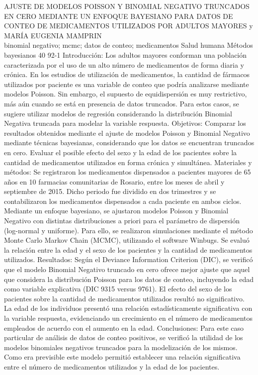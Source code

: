 \A
{AJUSTE DE MODELOS POISSON Y BINOMIAL NEGATIVO TRUNCADOS EN CERO MEDIANTE UN ENFOQUE BAYESIANO PARA DATOS DE CONTEO DE MEDICAMENTOS UTILIZADOS POR ADULTOS MAYORES}
{ y MARÍA EUGENIA MAMPRIN}
{
\\}
{binomial negativo; mcmc; datos de conteo; medicamentos} 
 {Salud humana} 
 {Métodos bayesianos} 
 {40} 
 {92-1}
{Introducción: Los adultos mayores conforman una población caracterizada por el uso de un alto número de medicamentos de forma diaria y crónica. En los estudios de utilización de medicamentos, la cantidad de fármacos utilizados por paciente es una variable de conteo que podría analizarse mediante modelos Poisson. Sin embargo, el supuesto de equidispersión es muy restrictivo, más aún cuando se está en presencia de datos truncados. Para estos casos, se sugiere utilizar modelos de regresión considerando la distribución Binomial Negativa truncada para modelar la variable respuesta. Objetivos: Comparar los resultados obtenidos mediante el ajuste de modelos Poisson y Binomial Negativo mediante técnicas bayesianas, considerando que los datos se encuentran truncados en cero. Evaluar el posible efecto del sexo y la edad de los pacientes sobre la cantidad de medicamentos utilizados en forma crónica y simultánea. Materiales y métodos: Se registraron los medicamentos dispensados a pacientes mayores de 65 años en 10 farmacias comunitarias de Rosario, entre los meses de abril y septiembre de 2015. Dicho periodo fue dividido en dos trimestres y se contabilizaron los medicamentos dispensados a cada paciente en ambos ciclos. Mediante un enfoque bayesiano, se ajustaron modelos Poisson y Binomial Negativo con distintas distribuciones a priori para el parámetro de dispersión (log-normal y uniforme). Para ello, se realizaron simulaciones mediante el método Monte Carlo Markov Chain (MCMC), utilizando el software Winbugs. Se evaluó la relación entre la edad y el sexo de los pacientes y la cantidad de medicamentos utilizados. Resultados: Según el Deviance Information Criterion (DIC), se verificó que el modelo Binomial Negativo truncado en cero ofrece mejor ajuste que aquel que considera la distribución Poisson para los datos de conteo, incluyendo la edad como variable explicativa (DIC 9315 versus 9761). El efecto del sexo de los pacientes sobre la cantidad de medicamentos utilizados resultó no significativo. La edad de los individuos presentó una relación estadísticamente significativa con la variable respuesta, evidenciando un crecimiento en el número de medicamentos empleados de acuerdo con el aumento en la edad. Conclusiones: Para este caso particular de análisis de datos de conteo positivos, se verificó la utilidad de los modelos binomiales negativos truncados para la modelización de los mismos. Como era previsible este modelo permitió establecer una relación significativa entre el número de medicamentos utilizados y la edad de los pacientes.}
